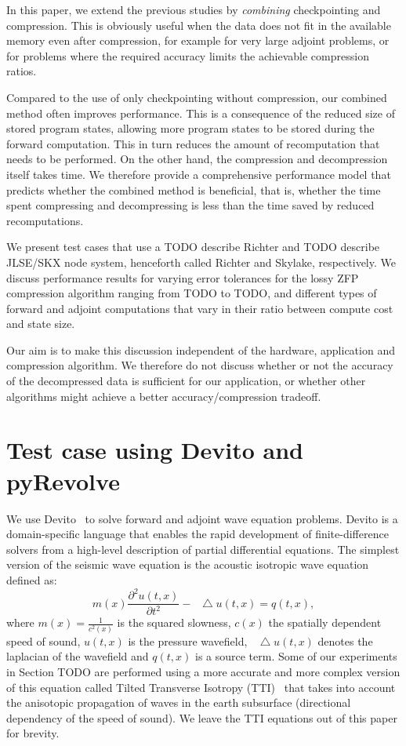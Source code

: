 \documentclass[conference]{IEEEtran}
\newcommand*\Laplace{\mathop{}\!\mathbin\bigtriangleup}
\begin{document}
In this paper, we extend the previous studies by \emph{combining} checkpointing
and compression. This is obviously useful when the data does not fit in the
available memory even after compression, for example for very large adjoint
problems, or for problems where the required accuracy limits the achievable
compression ratios.

Compared to the use of only checkpointing without compression, our combined method often improves performance. This is a consequence of the reduced size of stored program states, allowing more program states to be stored during the forward computation. This in turn reduces the amount of recomputation that needs to be performed. On the other hand, the compression and decompression itself takes time. We therefore provide a comprehensive performance model that predicts whether the combined method is beneficial, that is, whether the time spent compressing and decompressing is less than the time saved by reduced
recomputations.

We present test cases that use a TODO describe Richter
and TODO describe JLSE/SKX node system, henceforth called Richter and Skylake,
respectively. We discuss performance results for varying error tolerances for
the lossy ZFP compression algorithm ranging from TODO to TODO, and different
types of forward and adjoint computations that vary in their ratio between
compute cost and state size. 

Our aim is to make this discussion independent of the hardware, application and
compression algorithm. We therefore do not discuss whether or not the accuracy
of the decompressed data is sufficient for our application, or whether
other algorithms might achieve a better accuracy/compression tradeoff.

\section{Test case using Devito and pyRevolve}
We use Devito~\cite{devito-api,devito-compiler} to solve forward and adjoint
wave equation problems. Devito is a domain-specific language that enables the
rapid development of finite-difference solvers from a high-level description
of partial differential equations. The simplest version of the seismic wave
equation is the acoustic isotropic wave equation defined as:
\begin{equation}
m(x)\frac{\partial^2 u(t, x)}{\partial t^2} - \Laplace u(t, x) = q(t, x),
\label{eqn:wave}
\end{equation}
where $m(x) = \frac{1}{c^2(x)}$ is the squared slowness, $c(x)$ the spatially
dependent speed of sound, $u(t, x)$ is the pressure wavefield, $\Laplace u(t, x)$ denotes the laplacian of the wavefield and $q(t, x)$ is a source term.
Some of our experiments in Section TODO are performed using a more accurate
and more complex version of this equation called Tilted Transverse Isotropy
(TTI)~\cite{zhang2011stable} that takes into account the anisotopic propagation of waves in the earth subsurface (directional dependency of the speed of sound). We leave the TTI equations out of this paper
for brevity. 
\end{document}
